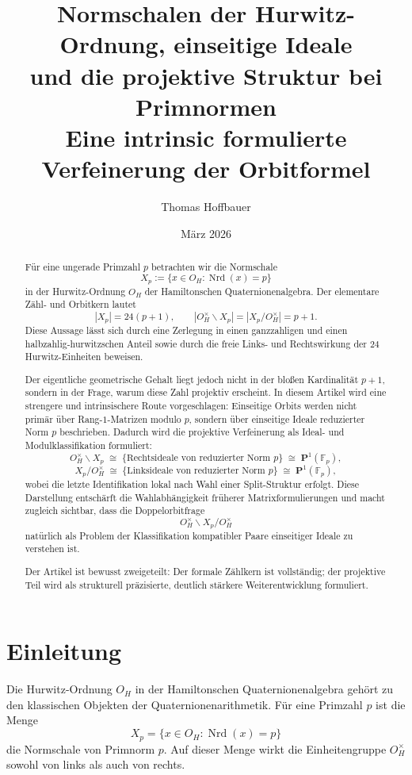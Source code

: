 \documentclass[12pt,a4paper]{article}
\title{\textbf{Normschalen der Hurwitz-Ordnung, einseitige Ideale\\ und die projektive Struktur bei Primnormen}\\[0.6em]
	\large Eine intrinsic formulierte Verfeinerung der Orbitformel}
\author{Thomas Hoffbauer}
\date{März 2026}
\theoremstyle{definition}
\newcommand{\OH}{O_H}
\newcommand{\Nrd}{\operatorname{Nrd}}
\begin{document}
	\maketitle
	
	\begin{abstract}
		Für eine ungerade Primzahl \(p\) betrachten wir die Normschale
		\[
		X_p:=\{x\in \OH:\Nrd(x)=p\}
		\]
		in der Hurwitz-Ordnung \(\OH\) der Hamiltonschen Quaternionenalgebra. Der elementare Zähl- und Orbitkern lautet
		\[
		|X_p|=24(p+1),\qquad |\OH^\times\backslash X_p|=|X_p/\OH^\times|=p+1.
		\]
		Diese Aussage lässt sich durch eine Zerlegung in einen ganzzahligen und einen halbzahlig-hurwitzschen Anteil sowie durch die freie Links- und Rechtswirkung der \(24\) Hurwitz-Einheiten beweisen.
		
		Der eigentliche geometrische Gehalt liegt jedoch nicht in der bloßen Kardinalität \(p+1\), sondern in der Frage, warum diese Zahl projektiv erscheint. In diesem Artikel wird eine strengere und intrinsischere Route vorgeschlagen: Einseitige Orbits werden nicht primär über Rang-\(1\)-Matrizen modulo \(p\), sondern über einseitige Ideale reduzierter Norm \(p\) beschrieben. Dadurch wird die projektive Verfeinerung als Ideal- und Modulklassifikation formuliert:
		\[
		\OH^\times\backslash X_p
		\;\cong\;
		\{\text{Rechtsideale von reduzierter Norm }p\}
		\;\cong\;
		\mathbf P^1(\mathbb F_p),
		\]
		\[
		X_p/\OH^\times
		\;\cong\;
		\{\text{Linksideale von reduzierter Norm }p\}
		\;\cong\;
		\mathbf P^1(\mathbb F_p),
		\]
		wobei die letzte Identifikation lokal nach Wahl einer Split-Struktur erfolgt. Diese Darstellung entschärft die Wahlabhängigkeit früherer Matrixformulierungen und macht zugleich sichtbar, dass die Doppelorbitfrage
		\[
		\OH^\times\backslash X_p/\OH^\times
		\]
		natürlich als Problem der Klassifikation kompatibler Paare einseitiger Ideale zu verstehen ist.
		
		Der Artikel ist bewusst zweigeteilt: Der formale Zählkern ist vollständig; der projektive Teil wird als strukturell präzisierte, deutlich stärkere Weiterentwicklung formuliert.
	\end{abstract}
	
	\tableofcontents
	
	\section{Einleitung}
	
	Die Hurwitz-Ordnung \(\OH\) in der Hamiltonschen Quaternionenalgebra gehört zu den klassischen Objekten der Quaternionenarithmetik. Für eine Primzahl \(p\) ist die Menge
	\[
	X_p=\{x\in \OH:\Nrd(x)=p\}
	\]
	die Normschale von Primnorm \(p\). Auf dieser Menge wirkt die Einheitengruppe \(\OH^\times\) sowohl von links als auch von rechts.
	
\end{document}
